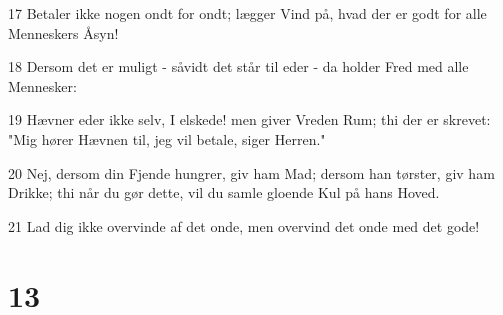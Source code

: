 \par 17 Betaler ikke nogen ondt for ondt; lægger Vind på, hvad der er godt for alle Menneskers Åsyn!
\par 18 Dersom det er muligt - såvidt det står til eder - da holder Fred med alle Mennesker:
\par 19 Hævner eder ikke selv, I elskede! men giver Vreden Rum; thi der er skrevet: "Mig hører Hævnen til, jeg vil betale, siger Herren."
\par 20 Nej, dersom din Fjende hungrer, giv ham Mad; dersom han tørster, giv ham Drikke; thi når du gør dette, vil du samle gloende Kul på hans Hoved.
\par 21 Lad dig ikke overvinde af det onde, men overvind det onde med det gode!

\chapter{13}

